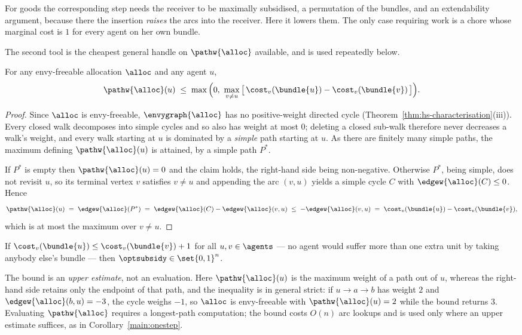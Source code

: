 For goods the corresponding step needs the receiver to be maximally subsidised,
a permutation of the bundles, and an extendability argument, because there the
insertion \emph{raises} the arcs into the receiver. Here it lowers them. The
only case requiring work is a chore whose marginal cost is $1$ for every agent
on her own bundle.

The second tool is the cheapest general handle on $\pathw{\alloc}$ available,
and is used repeatedly below.

\begin{theorem}
\label{main:cyclebound}
For any envy-freeable allocation $\alloc$ and any agent $u$,
\[
  \pathw{\alloc}(u) \;\le\; \max\Big(0, \ \max_{v \ne u}
  \big[\,\cost_v(\bundle{u}) - \cost_v(\bundle{v})\,\big]\Big).
\]
\end{theorem}

\begin{proof}
Since $\alloc$ is envy-freeable, $\envygraph{\alloc}$ has no positive-weight
directed cycle (Theorem~\ref{thm:hs-characterisation}(iii)). Every closed walk
decomposes into simple cycles and so also has weight at most $0$; deleting a
closed sub-walk therefore never decreases a walk's weight, and every walk
starting at $u$ is dominated by a \emph{simple} path starting at $u$. As there
are finitely many simple paths, the maximum defining $\pathw{\alloc}(u)$ is
attained, by a simple path $P^{\ast}$.

If $P^{\ast}$ is empty then $\pathw{\alloc}(u) = 0$ and the claim holds, the
right-hand side being non-negative. Otherwise $P^{\ast}$, being simple, does not
revisit $u$, so its terminal vertex $v$ satisfies $v \ne u$ and appending the arc
$(v,u)$ yields a simple cycle $C$ with $\edgew{\alloc}(C) \le 0$. Hence
\[
  \pathw{\alloc}(u) \;=\; \edgew{\alloc}(P^{\ast})
  \;=\; \edgew{\alloc}(C) - \edgew{\alloc}(v,u)
  \;\le\; -\edgew{\alloc}(v,u)
  \;=\; \cost_v(\bundle{u}) - \cost_v(\bundle{v}),
\]
which is at most the maximum over $v \ne u$.
\end{proof}

\begin{corollary}
\label{main:onestep}
If $\cost_v(\bundle{u}) \le \cost_v(\bundle{v}) + 1$ for all $u,v \in \agents$
--- no agent would suffer more than one extra unit by taking anybody else's
bundle --- then $\optsubsidy \in \set{0,1}^n$.
\end{corollary}

The bound is an \emph{upper estimate}, not an evaluation. Here
$\pathw{\alloc}(u)$ is the maximum weight of a path out of $u$, whereas the
right-hand side retains only the endpoint of that path, and the inequality is in
general strict: if $u \to a \to b$ has weight $2$ and
$\edgew{\alloc}(b,u) = -3$, the cycle weighs $-1$, so $\alloc$ is envy-freeable
with $\pathw{\alloc}(u) = 2$ while the bound returns $3$. Evaluating
$\pathw{\alloc}$ requires a longest-path computation; the bound costs $O(n)$ arc
lookups and is used only where an upper estimate suffices, as in
Corollary~\ref{main:onestep}.

